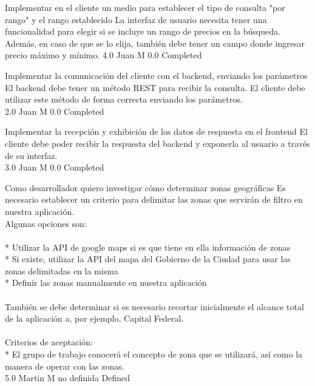 		{Implementar en el cliente un medio para establecer el tipo de consulta "por rango" y el rango establecido} %
		{La interfaz de usuario necesita tener una funcionalidad para elegir si se
incluye un rango de precios en la búsqueda. Además, en caso de que se lo
elija, también debe tener un campo donde ingresar precio máximo y mínimo.
} %
		{4.0} %
		{Juan M} %
		{0.0} %
		{Completed} %

		{Implementar la comunicación del cliente con el backend, enviando los parámetros} %
		{El backend debe tener un método REST para recibir la consulta. El cliente debe
utilizar este método de forma correcta enviando los parámetros.\\
} %
		{2.0} %
		{Juan M} %
		{0.0} %
		{Completed} %

		{Implementar la recepción y exhibición de los datos de respuesta en el frontend} %
		{El cliente debe poder recibir la respuesta del backend y exponerla al usuario
a través de su interfaz.\\
} %
		{3.0} %
		{Juan M} %
		{0.0} %
		{Completed} %


\vspace{20pt}

	{Como desarrollador quiero investigar cómo determinar zonas geográficas} %
	{Es necesario establecer un criterio para delimitar las zonas que servirán de
filtro en nuestra aplicación.\\
Algunas opciones son:\\
  \\
* Utilizar la API de google maps si es que tiene en ella información de zonas\\
* Si existe, utilizar la API del mapa del Gobierno de la Ciudad para usar las zonas delimitadas en la misma\\
* Definir las zonas manualmente en nuestra aplicación\\
  \\
También se debe determinar si es necesario recortar inicialmente el alcance
total de la aplicación a, por ejemplo, Capital Federal.\\
  \\
Criterios de aceptación:\\
* El grupo de trabajo conocerá el concepto de zona que se utilizará, así como la manera de operar con las zonas.  \\
} %
	{} %
	{5.0} %
	{Martin M} %
	{no definida} %
	{Defined} %


